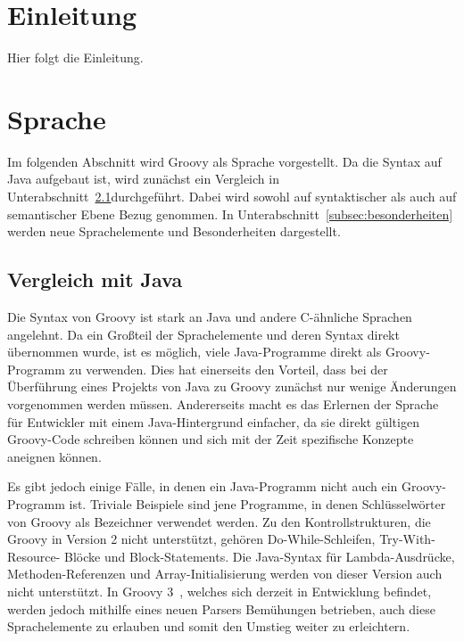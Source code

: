 \documentclass[11pt,a4paper]{article}
\title{\paperTitle}
\author{\paperAuthor}
\date{\paperDate}
\begin{document}

	\maketitle

	\tableofcontents


	\section{Einleitung}\label{sec:einleitung}

	Hier folgt die Einleitung.


	\section{Sprache}\label{sec:sprache}

	Im folgenden Abschnitt wird Groovy als Sprache vorgestellt.
	Da die Syntax auf Java aufgebaut ist, wird zunächst ein Vergleich in Unterabschnitt~\ref{subsec:vergleichMitJava}durchgeführt.
	Dabei wird sowohl auf syntaktischer als auch auf semantischer Ebene Bezug genommen.
	In Unterabschnitt~\ref{subsec:besonderheiten} werden neue Sprachelemente und Besonderheiten dargestellt.

	\subsection{Vergleich mit Java}\label{subsec:vergleichMitJava}

	Die Syntax von Groovy ist stark an Java und andere C-ähnliche Sprachen angelehnt.
	Da ein Großteil der Sprachelemente und deren Syntax direkt übernommen wurde, ist es möglich, viele Java-Programme direkt als Groovy-Programm zu verwenden.
	Dies hat einerseits den Vorteil, dass bei der Überführung eines Projekts von Java zu Groovy zunächst nur wenige Änderungen vorgenommen werden müssen.
	Andererseits macht es das Erlernen der Sprache für Entwickler mit einem Java-Hintergrund einfacher, da sie direkt gültigen Groovy-Code schreiben können und sich mit der Zeit spezifische Konzepte aneignen können.

	Es gibt jedoch einige Fälle, in denen ein Java-Programm nicht auch ein Groovy-Programm ist.
	Triviale Beispiele sind jene Programme, in denen Schlüsselwörter von Groovy als Bezeichner verwendet werden.
	Zu den Kontrollstrukturen, die Groovy in Version 2 nicht unterstützt, gehören Do-While-Schleifen, Try-With-Resource- Blöcke und Block-Statements.
	Die Java-Syntax für Lambda-Ausdrücke, Methoden-Referenzen und Array-Initialisierung werden von dieser Version auch nicht unterstützt.
	In Groovy 3~\cite{groovy-lang:release3}, welches sich derzeit in Entwicklung befindet, werden jedoch mithilfe eines neuen Parsers Bemühungen betrieben, auch diese Sprachelemente zu erlauben und somit den Umstieg weiter zu erleichtern.
\end{document}
